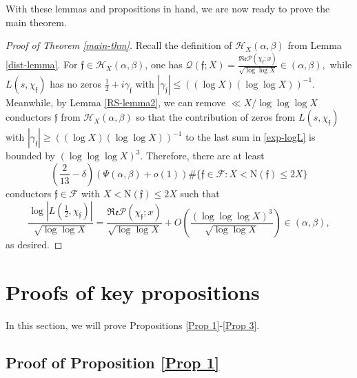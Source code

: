 \documentclass[11pt]{amsart}
\newcommand{\norm}{\mathrm{N}}
\newcommand{\oh}{\mbox{$\frac{1}{2}$}}
\numberwithin{equation}{section}
\renewcommand{\Re}{{\mathfrak{Re}}}
\theoremstyle{remark}
\begin{document}
With these lemmas and propositions in hand, we are now ready to prove the main theorem.
\begin{proof}[Proof of Theorem \ref{main-thm}]
Recall the definition of $\mathcal{H}_X(\alpha,\beta)$ from Lemma \ref{dist-lemma}. For $\mathfrak{f}\in\mathcal{H}_X(\alpha,\beta)$, one has
$
\mathcal{Q}(\mathfrak{f};X) = \frac{\Re \mathcal{P}(\chi_\mathfrak{f}; x)   }{\sqrt{ \log \log X}}\in (\alpha,\beta) , 
$
while  $ L(s,\chi_{\mathfrak{f}})$ has no zeros $\frac{1}{2}+i\gamma_\mathfrak{f}$ with
$
 |\gamma_\mathfrak{f}|  \le( (\log X) (\log\log X))^{-1}.
$
Meanwhile, by Lemma \ref{RS-lemma2},  we can remove $\ll  X/\log \log\log X$ conductors $\mathfrak{f}$ from $\mathcal{H}_X(\alpha,\beta)$ so that the
contribution of zeros from $ L(s,\chi_{\mathfrak{f}})$ with $|\gamma_{\mathfrak{f}}| \ge ((\log X) (\log\log X))^{-1} $ to the last sum in \eqref{exp-logL} 
is bounded by $ (\log \log\log X)^3$. Therefore, there are at least 
$$
\left(\frac{2}{13}-\delta\right)
( \Psi(\alpha,\beta) +o(1) )
\# \{ \mathfrak{f} \in\mathcal{F} :  X < \norm(\mathfrak{f}) \le 2X \}
$$
conductors $\mathfrak{f}\in\mathcal{F}$ with $X< \norm(\mathfrak{f})\le 2X$ such that
$$
\frac{ \log | L(\oh , \chi_\mathfrak{f})|  }{\sqrt{ \log\log X}} = \frac{\Re \mathcal{P}(\chi_\mathfrak{f}; x)  }{\sqrt{ \log\log X}}
 +O\left(\frac{ (\log \log\log X)^3}{\sqrt{\log\log X}}\right)\in (\alpha,\beta),
$$
as desired. 
\end{proof}








\section{Proofs of key propositions}\label{section proofs of props}

In this section, we will prove Propositions \ref{Prop 1}-\ref{Prop 3}.

\subsection{Proof of Proposition \ref{Prop 1}}
\end{document}
